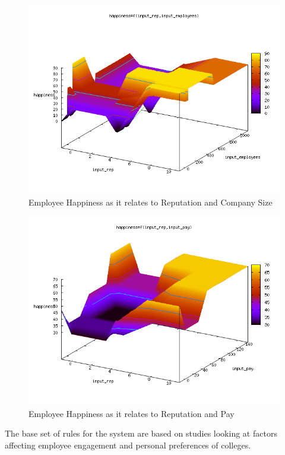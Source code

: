 \documentclass[12pt,fleqn,reqno,letterpaper]{article}
\begin{document}
\begin{figure}[H]
  \centering
  \includegraphics[scale=0.5,natwidth=640,natheight=480]{fig/baseline_input_rep_input_employees_happiness.png}
  \caption{Employee Happiness as it relates to Reputation and Company Size}
  \label{fig:RE}
\end{figure}

\begin{figure}[H]
  \centering
  \includegraphics[scale=0.5,natwidth=640,natheight=480]{fig/baseline_input_rep_input_pay_happiness.png}
  \caption{Employee Happiness as it relates to Reputation and Pay}
  \label{fig:RP}
\end{figure}

The base set of rules for the system are based on studies looking at factors affecting employee engagement and personal preferences of colleges.
\end{document}
